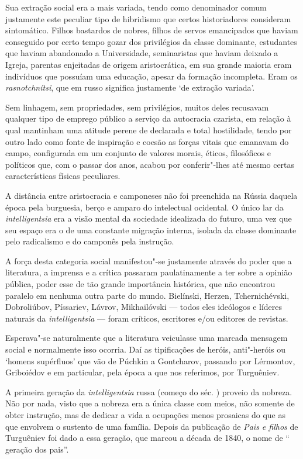 Sua extração social era a mais variada, tendo como denominador comum
justamente este peculiar tipo de hibridismo que certos historiadores
consideram sintomático. Filhos bastardos de nobres, filhos de servos
emancipados que haviam conseguido por certo tempo gozar dos privilégios
da classe dominante, estudantes que haviam abandonado a Universidade,
seminaristas que haviam deixado a Igreja, parentas enjeitadas de origem
aristocrática, em sua grande maioria eram indivíduos que possuíam uma
educação, apesar da formação incompleta. Eram os \emph{rasnotchnítsi},
que em russo significa justamente `de extração variada'.

Sem linhagem, sem propriedades, sem privilégios, muitos deles recusavam
qualquer tipo de emprego público a serviço da autocracia czarista, em
relação à qual mantinham uma atitude perene de declarada e total
hostilidade, tendo por outro lado como fonte de inspiração e coesão as
forças vitais que emanavam do campo, configurada em um conjunto de
valores morais, éticos, filosóficos e políticos que, com o passar dos
anos, acabou por conferir"-lhes até mesmo certas características físicas
peculiares.

A distância entre aristocracia e camponeses não foi preenchida na Rússia
daquela época pela burguesia, berço e amparo do intelectual ocidental. O
único lar da \emph{intelligentsia} era a visão mental da sociedade
idealizada do futuro, uma vez que seu espaço era o de uma constante
migração interna, isolada da classe dominante pelo radicalismo e do
camponês pela instrução.

A força desta categoria social manifestou"-se justamente através do poder
que a literatura, a imprensa e a crítica passaram paulatinamente a ter
sobre a opinião pública, poder esse de tão grande importância histórica,
que não encontrou paralelo em nenhuma outra parte do mundo. Bielínski,
Herzen, Tchernichévski, Dobroliúbov, Píssariev, Lávrov, Mikhailóvski ---
todos eles ideólogos e líderes naturais da \emph{intelligentsia} ---
foram críticos, escritores e/ou editores de revistas.

Esperava"-se naturalmente que a literatura veiculasse uma marcada
mensagem social e normalmente isso ocorria. Daí as tipificações de
heróis, anti"-heróis ou `homens supérfluos' que vão de Púchkin a
Gontcharov, passando por Lérmontov, Griboiédov e em particular, pela
época a que nos referimos, por Turguêniev.

A primeira geração da \emph{intelligentsia} { } russa (começo do séc.
) proveio da nobreza. Não por nada, visto que a nobreza era a única
classe com meios, não somente de obter instrução, mas de dedicar a vida
a ocupações menos prosaicas do que as que envolvem o sustento de uma
família. Depois da publicação de \emph{Pais e filhos} de Turguêniev foi
dado a essa geração, que marcou a década de 1840, o nome de `` geração
dos pais''.


